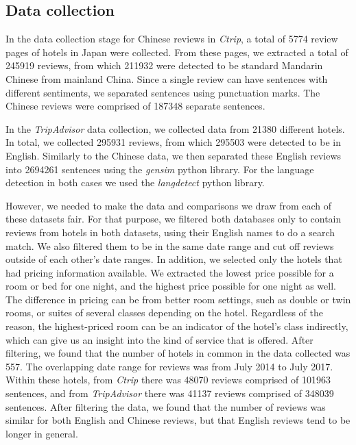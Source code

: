 \documentclass[smallextended,natbib]{svjour3}       %
\begin{document}
  \subsection{Data collection}\label{datacollection}

    In the data collection stage for Chinese reviews in \textit{Ctrip}, a total of \num[group-separator={,}]{5774} review pages of hotels in Japan were collected. From these pages, we extracted a total of \num[group-separator={,}]{245919} reviews, from which \num[group-separator={,}]{211932} were detected to be standard Mandarin Chinese from mainland China. Since a single review can have sentences with different sentiments, we separated sentences using punctuation marks. The Chinese reviews were comprised of \num[group-separator={,}]{187348} separate sentences. 

    In the \textit{TripAdvisor} data collection, we collected data from \num[group-separator={,}]{21380} different hotels. In total, we collected \num[group-separator={,}]{295931} reviews, from which \num[group-separator={,}]{295503} were detected to be in English. Similarly to the Chinese data, we then separated these English reviews into \num[group-separator={,}]{2694261} sentences using the \textit{gensim} python library. For the language detection in both cases we used the \textit{langdetect} python library.

    However, we needed to make the data and comparisons we draw from each of these datasets fair. For that purpose, we filtered both databases only to contain reviews from hotels in both datasets, using their English names to do a search match. We also filtered them to be in the same date range and cut off reviews outside of each other's date ranges. In addition, we selected only the hotels that had pricing information available. We extracted the lowest price possible for a room or bed for one night, and the highest price possible for one night as well. The difference in pricing can be from better room settings, such as double or twin rooms, or suites of several classes depending on the hotel. Regardless of the reason, the highest-priced room can be an indicator of the hotel's class indirectly, which can give us an insight into the kind of service that is offered. After filtering, we found that the number of hotels in common in the data collected was \num[group-separator={,}]{557}. The overlapping date range for reviews was from July 2014 to July 2017. Within these hotels, from \textit{Ctrip} there was \num[group-separator={,}]{48070} reviews comprised of \num[group-separator={,}]{101963} sentences, and from \textit{TripAdvisor} there was \num[group-separator={,}]{41137} reviews comprised of \num[group-separator={,}]{348039} sentences. After filtering the data, we found that the number of reviews was similar for both English and Chinese reviews, but that English reviews tend to be longer in general.
\end{document}
